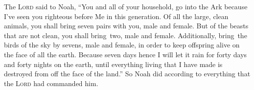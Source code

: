 
\begin{inparaenum}
     The \textsc{Lord} said to Noah, ``You and all of your household, go into the Ark because I've seen you righteous before Me in this generation.%
     Of all the large, clean animals, you shall bring seven pairs with you, male and female. But of the beasts that are not clean, you shall bring\understood\ two, male and female.%
     Additionally, bring\understood\ the birds of the sky by sevens, male and female, in order to keep offspring alive on the face of all the earth.%
     Because seven days hence I will let it rain for forty days and forty nights on the earth, until everything living that I have made is destroyed from off the face of the land.''%
     So Noah did according to everything that the \textsc{Lord} had commanded him.%
    

\end{inparaenum}
